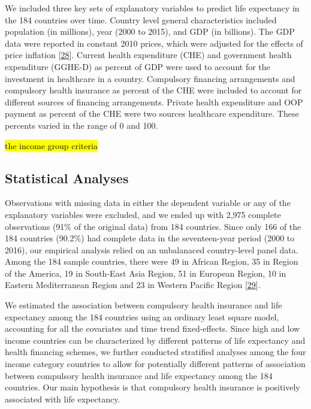 \documentclass[]{elsarticle} %
\begin{document}
We included three key sets of explanatory variables to predict life expectancy in the 184 countries over time.
Country level general characteristics included population (in millions), year (2000 to 2015), and GDP (in billions).
The GDP data were reported in constant 2010 prices, which were adjusted for the effects of price inflation {[}\protect\hyperlink{ref-worldbankconstant}{28}{]}.
Current health expenditure (CHE) and government health expenditure (GGHE-D) as percent of GDP were used to account for the investment in healthcare in a country.
Compulsory financing arrangements and compulsory health insurance as percent of the CHE were included to account for different sources of financing arrangements.
Private health expenditure and OOP payment as percent of the CHE were two sources healthcare expenditure.
These percents varied in the range of 0 and 100.

\hl{the income group criteria}

\hypertarget{statistical-analyses}{%
\subsection{Statistical Analyses}\label{statistical-analyses}}

Observations with missing data in either the dependent variable or any of the explanatory variables were excluded, and we ended up with 2,975 complete observations (91\% of the original data) from 184 countries.
Since only 166 of the 184 countries (90.2\%) had complete data in the seventeen-year period (2000 to 2016), our empirical analysis relied on an unbalanaced country-level panel data.
Among the 184 sample countries, there were 49 in African Region, 35 in Region of the America, 19 in South-East Asia Region, 51 in European Region, 10 in Eastern Mediterranean Region and 23 in Western Pacific Region {[}\protect\hyperlink{ref-WHOregion}{29}{]}.

We estimated the association between compulsory health insurance and life expectancy among the 184 countries using an ordinary least square model, accounting for all the covariates and time trend fixed-effects.
Since high and low income countries can be characterized by different patterns of life expectancy and health financing schemes, we further conducted stratified analyses among the four income category countries to allow for potentially different patterns of association between compulsory health insurance and life expectancy among the 184 countries.
Our main hypothesis is that compulsory health insurance is positively associated with life expectancy.
\end{document}
